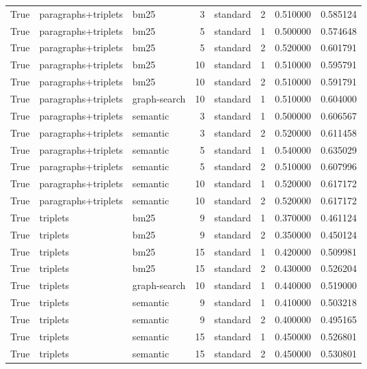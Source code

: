 \begin{tabular}{rllrlrrr}
True & paragraphs+triplets & bm25 & 3 & standard & 2 & 0.510000 & 0.585124 \\
True & paragraphs+triplets & bm25 & 5 & standard & 1 & 0.500000 & 0.574648 \\
True & paragraphs+triplets & bm25 & 5 & standard & 2 & 0.520000 & 0.601791 \\
True & paragraphs+triplets & bm25 & 10 & standard & 1 & 0.510000 & 0.595791 \\
True & paragraphs+triplets & bm25 & 10 & standard & 2 & 0.510000 & 0.591791 \\
True & paragraphs+triplets & graph-search & 10 & standard & 1 & 0.510000 & 0.604000 \\
True & paragraphs+triplets & semantic & 3 & standard & 1 & 0.500000 & 0.606567 \\
True & paragraphs+triplets & semantic & 3 & standard & 2 & 0.520000 & 0.611458 \\
True & paragraphs+triplets & semantic & 5 & standard & 1 & 0.540000 & 0.635029 \\
True & paragraphs+triplets & semantic & 5 & standard & 2 & 0.510000 & 0.607996 \\
True & paragraphs+triplets & semantic & 10 & standard & 1 & 0.520000 & 0.617172 \\
True & paragraphs+triplets & semantic & 10 & standard & 2 & 0.520000 & 0.617172 \\
True & triplets & bm25 & 9 & standard & 1 & 0.370000 & 0.461124 \\
True & triplets & bm25 & 9 & standard & 2 & 0.350000 & 0.450124 \\
True & triplets & bm25 & 15 & standard & 1 & 0.420000 & 0.509981 \\
True & triplets & bm25 & 15 & standard & 2 & 0.430000 & 0.526204 \\
True & triplets & graph-search & 10 & standard & 1 & 0.440000 & 0.519000 \\
True & triplets & semantic & 9 & standard & 1 & 0.410000 & 0.503218 \\
True & triplets & semantic & 9 & standard & 2 & 0.400000 & 0.495165 \\
True & triplets & semantic & 15 & standard & 1 & 0.450000 & 0.526801 \\
True & triplets & semantic & 15 & standard & 2 & 0.450000 & 0.530801 \\
\bottomrule
\end{tabular}
